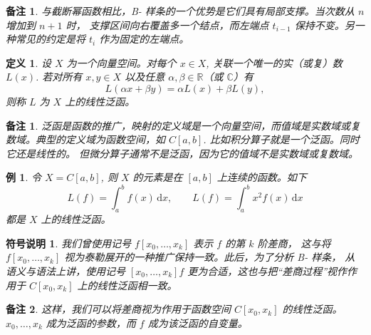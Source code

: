 \documentclass[a4paper]{ctexart}
\newtheorem{remark}{备注}
\newtheorem*{remark*}{备注}
\newtheorem{notation}{符号说明}
\newtheorem{definition}[theorem]{定义} %
\newtheorem{example}[theorem]{例}
\numberwithin{theorem}{section}
\numberwithin{equation}{section}
\numberwithin{figure}{section}
\numberwithin{remark}{section}
\begin{document}
\begin{remark}
    \label{rem::local_support_advantage}
与截断幂函数相比，B- 样条的一个优势是它们具有局部支撑。当次数从 $n$ 增加到 $n+1$ 时，
支撑区间向右覆盖多一个结点，而左端点 $t_{i-1}$ 保持不变。另一种常见的约定是将 $t_i$ 作为固定的左端点。
\end{remark}

\begin{definition}
    \label{def::linear_functional}
设 $X$ 为一个向量空间。对每个 $x\in X$, 关联一个唯一的实（或复）数 $L(x)$. 
若对所有 $x,y\in X$ 以及任意 $\alpha,\beta\in\mathbb{R}$（或 $\mathbb{C}$）有
\begin{equation}
\label{eq::linear_functional_axiom}
L(\alpha x+\beta y)=\alpha L(x)+\beta L(y),
\end{equation}
则称 $L$ 为 $X$ 上的线性泛函。
\end{definition}

\begin{remark*}
    泛函是函数的推广，映射的定义域是一个向量空间，而值域是实数域或复数域。典型的定义域为函数空间，如 $C[a,b]$. 比如积分算子就是一个泛函。同时它还是线性的。
    但微分算子通常不是泛函，因为它的值域不是实数域或复数域。
\end{remark*}

\begin{example}
    \label{ex::linear_functionals_on_Cab}
令 $X=C[a,b]$, 则 $X$ 的元素是在 $[a,b]$ 上连续的函数。如下
\begin{equation*}
\label{eq::functionals_examples}
L(f)=\int_{a}^{b} f(x)\,\mathrm{d}x,\qquad
L(f)=\int_{a}^{b} x^{2} f(x)\,\mathrm{d}x
\end{equation*}
都是 $X$ 上的线性泛函。
\end{example}

\begin{notation}
    \label{not::divided_diff_as_functional}
我们曾使用记号 $f[x_0,\ldots,x_k]$ 表示 $f$ 的第 $k$ 阶差商，
这与将 $f[x_0,\ldots,x_k]$ 视为泰勒展开的一种推广保持一致。此后，为了分析 B- 样条，
从语义与语法上讲，使用记号 $[x_0,\ldots,x_k]f$ 更为合适，这也与把“差商过程”视作作用于 $C[x_0,x_k]$ 上的线性泛函相一致。
\end{notation}

\begin{remark*}
    这样，我们可以将差商视为作用于函数空间 $C[x_0,x_k]$ 的线性泛函。$x_0,\ldots,x_k$ 成为泛函的参数，而 $f$ 成为该泛函的自变量。
\end{remark*}
\end{document}
